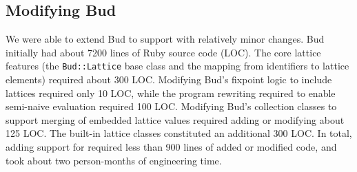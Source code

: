 \subsection{Modifying Bud}
We were able to extend Bud to support \lang with relatively minor changes. Bud
initially had about 7200 lines of Ruby source code (LOC). The core lattice
features (the \texttt{Bud::Lattice} base class and the mapping from identifiers
to lattice elements) required about 300 LOC. Modifying Bud's fixpoint logic to
include lattices required only 10 LOC, while the program rewriting required to
enable semi-naive evaluation required 100 LOC. Modifying Bud's collection
classes to support merging of embedded lattice values required adding or
modifying about 125 LOC. The built-in lattice classes constituted an additional
300 LOC. In total, adding support for \lang required less than 900 lines of
added or modified code, and took about two person-months of engineering time.%

